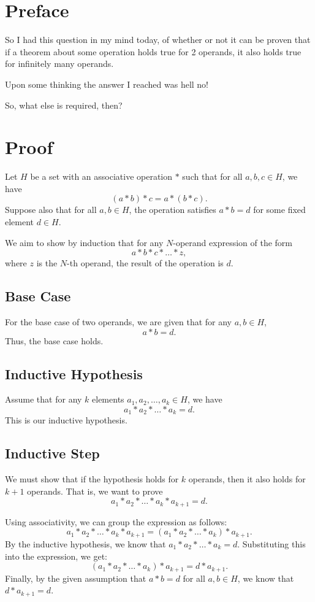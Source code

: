 \documentclass{article}
\begin{document}
\section{Preface}

So I had this question in my mind today, of whether or not it can be proven that if a theorem about some operation holds true for 2 operands, it also holds true for infinitely many operands.

Upon some thinking the answer I reached was hell no!

So, what else is required, then?

\section{Proof}

Let \( H \) be a set with an associative operation \( * \) such that for all \( a, b, c \in H \), we have
\[
(a * b) * c = a * (b * c).
\]
Suppose also that for all \( a, b \in H \), the operation satisfies \( a * b = d \) for some fixed element \( d \in H \).

We aim to show by induction that for any \( N \)-operand expression of the form
\[
a * b * c * \dots * z,
\]
where \( z \) is the \( N \)-th operand, the result of the operation is \( d \).

\subsection{Base Case}
For the base case of two operands, we are given that for any \( a, b \in H \), 
\[
a * b = d.
\]
Thus, the base case holds.

\subsection{Inductive Hypothesis}
Assume that for any \( k \) elements \( a_1, a_2, \ldots, a_k \in H \), we have
\[
a_1 * a_2 * \dots * a_k = d.
\]
This is our inductive hypothesis.

\subsection{Inductive Step}
We must show that if the hypothesis holds for \( k \) operands, then it also holds for \( k+1 \) operands. That is, we want to prove
\[
a_1 * a_2 * \dots * a_k * a_{k+1} = d.
\]

Using associativity, we can group the expression as follows:
\[
a_1 * a_2 * \dots * a_k * a_{k+1} = (a_1 * a_2 * \dots * a_k) * a_{k+1}.
\]
By the inductive hypothesis, we know that \( a_1 * a_2 * \dots * a_k = d \). Substituting this into the expression, we get:
\[
(a_1 * a_2 * \dots * a_k) * a_{k+1} = d * a_{k+1}.
\]
Finally, by the given assumption that \( a * b = d \) for all \( a, b \in H \), we know that \( d * a_{k+1} = d \).
\end{document}
